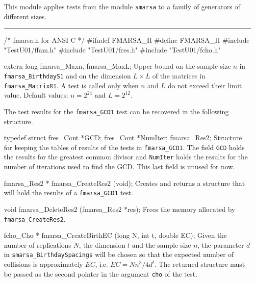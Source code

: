 
This module applies tests from the module {\tt smarsa}
to a family of generators of different sizes.


\bigskip\hrule
\code\hide
/* fmarsa.h for ANSI C */
#ifndef FMARSA_H
#define FMARSA_H
\endhide
#include "TestU01/ffam.h"
#include "TestU01/fres.h"
#include "TestU01/fcho.h"


extern long fmarsa_Maxn, fmarsa_MaxL;
\endcode
\tab
  Upper bound on the sample size $n$  in {\tt fmarsa\_BirthdayS1} and on
  the dimension  $L \times L$ of the matrices in {\tt fmarsa\_MatrixR1}.
  A test is called only when $n$ and $L$ do not exceed their limit value.
  Default values: $n = 2^{24}$ and $L = 2^{12}$.
\endtab

\ifdetailed  %



The test results for the {\tt fmarsa\_GCD1} test can be recovered
in the following structure.

\code

typedef struct {
   fres_Cont *GCD;
   fres_Cont *NumIter; 
} fmarsa_Res2;
\endcode
 \tab
  Structure for keeping the tables of results of the tests in
  {\tt fmarsa\_GCD1}. The field {\tt GCD} holds the results for the
  greatest common divisor  and {\tt NumIter} holds the results for the
  number of iterations used to find the GCD.
  This last field is unused for now.
 \endtab
\code


fmarsa_Res2 * fmarsa_CreateRes2 (void);
\endcode
 \tab 
  Creates and returns a structure that will hold the results
  of a  {\tt fmarsa\_GCD1} test. 
 \endtab
\code


void fmarsa_DeleteRes2 (fmarsa_Res2 *res);
\endcode
 \tab 
  Frees the memory allocated by {\tt fmarsa\_CreateRes2}.
 \endtab

\fi    %




\code

fcho_Cho * fmarsa_CreateBirthEC (long N, int t, double EC);
\endcode
 \tab 
  Given the number of replications $N$, the dimension $t$ and the sample
  size $n$, the parameter $d$ in {\tt smarsa\_BirthdaySpacings} will be chosen
  so that the expected number of collisions is approximately $EC$,
  i.e. $EC = Nn^3/4d^t$.
  The returned structure must be passed as the second pointer in the
  argument {\tt cho} of the test.
 \endtab
\code


